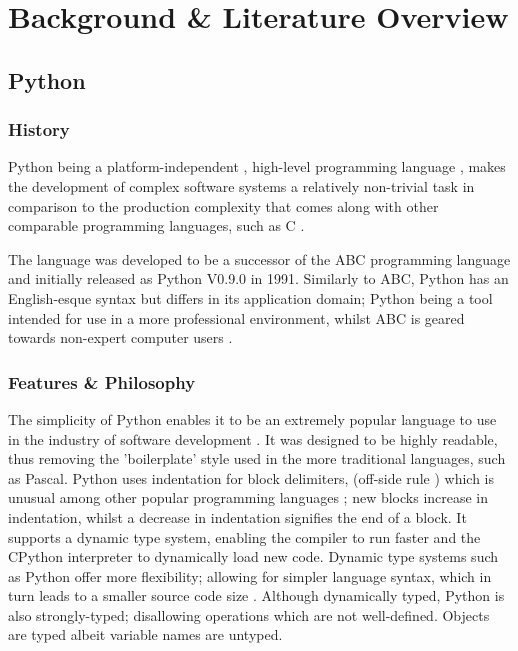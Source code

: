 \chapter{Background \& Literature Overview}

	\section{Python}
		\subsection{History}
		\par Python being a platform-independent \cite[]{srinath2017python}, high-level programming language \cite[pp.2--4]{van1995python}, makes the development of complex software systems a relatively non-trivial task
		in comparison to the production complexity that comes along with other comparable programming languages, such as C \cite[]{summerfield2007rapid}.
		\par The language was developed to be a successor of the ABC programming language \cite[]{geurts1990abc} and initially released as Python V0.9.0 in 
		1991. Similarly to ABC, Python has an English-esque syntax but differs in its application domain; Python being a tool intended for use in a more professional environment, whilst
		ABC is geared towards non-expert computer users \cite[pp.285--288]{van1991interactively}. 
		
		\subsection{Features \& Philosophy}
		\par The simplicity of Python enables it to be an extremely popular language to use in the industry of software development \cite[]{tiobe2022index}. It was designed to be highly readable, 
		thus removing the 'boilerplate' style used in the more traditional languages, such as Pascal. Python uses indentation for block delimiters,
		(off-side rule \cite[pp.4--5]{van2021python}) which is unusual among other popular programming languages \cite[pp.2--3]{van2021python}; new blocks increase in indentation, whilst a decrease in indentation signifies the end of 
		a block. It supports a dynamic type system, enabling the compiler to run faster and the CPython interpreter to dynamically load new code. 
		Dynamic type systems such as Python offer more flexibility; allowing for simpler language syntax, which in turn leads to a smaller source code size \cite[]{dynamic2013typing}. Although dynamically typed,
		Python is also strongly-typed; disallowing operations which are not well-defined. Objects are typed albeit variable names are untyped.

